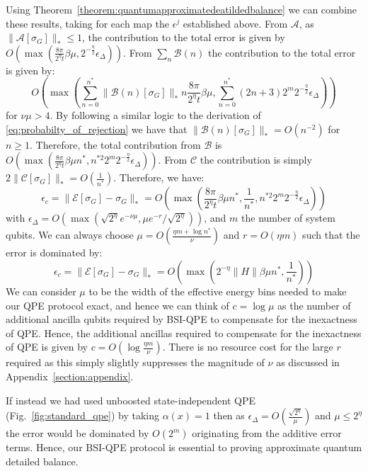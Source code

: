 \documentclass[aps,floatfix,10pt,amssymb,amsfont,amsmath,superscriptaddress,float,nofootinbib,longbibliography,nobalancelastpage,twocolumn]{revtex4-2}
\begin{document}
\begin{widetext}
Using Theorem~\ref{theorem:quantumapproximatedeatildedbalance} we can combine these results, taking for each map the $\epsilon^j$ established above. From $\mathcal{A}$, as $\|\mathcal{A}[\sigma_G]\|_* \leq 1$, the contribution to the total error is given by $O(\max(\frac{8\pi}{2^{\eta}t}\beta\mu,2^{-\frac{\eta}{2}}\epsilon_{\Delta}))$. From $\sum_n\mathcal{B}(n)$ the contribution to the total error is given by:
\begin{equation}
    O\!\left(\max\!\left(\sum_{n=0}^{n^*}\|\mathcal B(n)[\sigma_G]\|_* n\frac{8\pi}{2^{\eta}t}\beta \mu,
    \sum_{n=0}^{n^*}(2n+3)2^m2^{-\frac{\eta}{2}}\epsilon_{\Delta}\right)\right)
\end{equation}
for $\nu \mu > 4$. By following a similar logic to the derivation of \eqref{eq:probabilty_of_rejection} we have that $\|\mathcal B(n)[\sigma_G]\|_* = O(n^{-2})$ for $n\geq1$. Therefore, the total contribution from $\mathcal{B}$ is $O(\max(\frac{8\pi}{2^{\eta}t}\beta \mu n^*,n^{*2}2^m2^{-\frac{\eta}{2}}\epsilon_{\Delta}))$. From $\mathcal{C}$ the contribution is simply $2\|\mathcal{C}[\sigma_G]\|_* = O(\frac{1}{n^*})$. Therefore, we have:
 \begin{equation}
   \epsilon_c = \|\mathcal{E}[\sigma_G] - \sigma_G\|_* = O\left(\max\left( \frac{8\pi}{2^{\eta}t}\beta\mu n^* ,\frac{1}{n^*}, n^{*2}2^m2^{-\frac{\eta}{2}}\epsilon_{\Delta}\right)\right)
\end{equation}
with $\epsilon_{\Delta}=O(\max(\sqrt{2^{\eta}}e^{-\nu\mu},\mu e^{-r}/\sqrt{2^{\eta}}))$, and $m$ the number of system qubits. We can always choose $\mu = O(\frac{\eta m + \log n^*}{\nu})$ and $r=O(\eta m)$ such that the error is dominated by:
 \begin{equation}
   \epsilon_c = \|\mathcal{E}[\sigma_G] - \sigma_G\|_* = O\left(\max\left( 2^{-\eta}\|H\|\beta\mu n^* ,\frac{1}{n^*}\right)\right)
    \label{eq:error_bound}
\end{equation}
We can consider $\mu$ to be the width of the effective energy bins needed to make our QPE protocol exact, and hence we can think of $c = \log \mu$ as the number of additional ancilla qubits required by BSI-QPE to compensate for the inexactness of QPE. Hence, the additional ancillas required to compensate for the inexactness of QPE is given by $c = O(\log \frac{\eta m}{\nu})$. There is no resource cost for the large $r$ required as this simply slightly suppresses the magnitude of $\nu$ as discussed in Appendix~\ref{section:appendix}.

If instead we had used unboosted state-independent QPE (Fig.~\ref{fig:standard_qpe}) by taking $\alpha(x) =1$ then as $\epsilon_{\Delta} = O(\frac{\sqrt{2^{\eta}}}{\mu})$ and $\mu \leq 2^{\eta}$ the error would be dominated by $O(2^m)$ originating from the additive error terms. Hence, our BSI-QPE protocol is essential to proving approximate quantum detailed balance.
\end{widetext}
\end{document}
